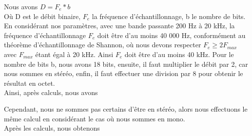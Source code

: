 Nous avons $D = F_e * b$
\\
Où D est le débit binaire, $F_e$ la fréquence d'échantillonnage, b le nombre de bits.
\\
En considérant nos paramètres, avec une bande passante 200 Hz à 20 kHz, la fréquence d'échantillonnage $F_e$ doit être d'au moins 40 000 Hz, conformément au théorème d'échantillonnage de Shannon, où nous devons respecter $F_e\ge 2F_{max}$ avec $F_{max}$ étant égal à 20 kHz. Ainsi $F_e$ doit être d'au moins 40 kHz. Pour le nombre de bits b, nous avons 18 bits, ensuite, il faut multiplier le débit par 2, car nous sommes en stéréo, enfin, il faut effectuer une division par 8 pour obtenir le résultat en octet.
\\
Ainsi, après calculs, nous avons

Cependant, nous ne sommes pas certains d'être en stéréo, alors nous effectuons le même calcul en considérant le cas où nous sommes en mono.
\\
Après les calculs, nous obtenons 